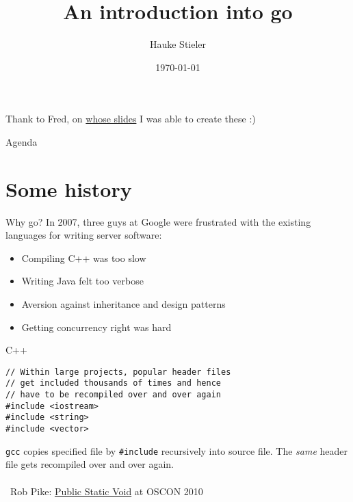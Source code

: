 \documentclass[10pt]{beamer}
\author{Hauke Stieler}
\title{An introduction into go}
\date{\footnotesize \today}
\institute{Universität Hamburg, Department of Informatics}
\begin{document}
	\maketitle
	
	
	\begin{frame}{}
		\begin{center}
			Thank to Fred, on \href{https://github.com/frectures/go}{whose slides} I was able to create these :)
		\end{center}
	\end{frame}
	
	
	\begin{frame}{Agenda}
		\tableofcontents
	\end{frame}

	
	\section{Some history}


	\begin{frame}{Why go?}
		In 2007, three guys at Google were frustrated with the existing languages for writing server software:
		\begin{itemize}
			\item Compiling C++ was too slow
			\item Writing Java felt too verbose
			\item Aversion against inheritance and design patterns
			\item Getting concurrency right was hard
		\end{itemize}
	\end{frame}
	

	\begin{frame}[t,fragile]{C++}
		\begin{verbatim}
// Within large projects, popular header files
// get included thousands of times and hence
// have to be recompiled over and over again
#include <iostream>
#include <string>
#include <vector>
		\end{verbatim}
		\pause
		\texttt{gcc} copies specified file by \texttt{#include} recursively into source file. The \textit{same} header file gets recompiled over and over again.\\
		\\
		\textrightarrow ~Rob Pike: \href{https://www.youtube.com/watch?v=5kj5ApnhPAE}{Public Static Void} at OSCON 2010
\end{frame}
\end{document}

